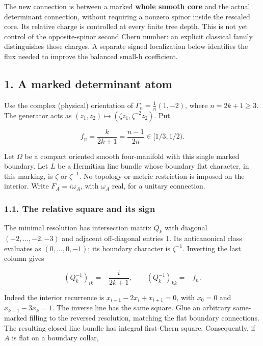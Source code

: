 \documentclass[
  10pt,
]{article}
\begin{document}
The new connection is between a marked \textbf{whole smooth core} and
the actual determinant connection, without requiring a nonzero spinor
inside the rescaled core. Its relative charge is controlled at every
finite tree depth. This is not yet control of the opposite-spinor second
Chern number: an explicit classical family distinguishes those charges.
A separate signed localization below identifies the flux needed to
improve the balanced small-h coefficient.

\hypertarget{a-marked-determinant-atom}{%
\subsection{1. A marked determinant
atom}\label{a-marked-determinant-atom}}

Use the complex (physical) orientation of \(\Gamma_n=\frac1n(1,-2)\),
where \(n=2k+1\ge3\). The generator acts as
\((z_1,z_2)\mapsto(\zeta z_1,\zeta^{-2}z_2)\). Put

\[
 f_n=\frac{k}{2k+1}=\frac{n-1}{2n}\in[1/3,1/2).
 \tag{1.1}
\]

Let \(\Omega\) be a compact oriented smooth four-manifold with this
single marked boundary. Let \(L\) be a Hermitian line bundle whose
boundary flat character, in this marking, is \(\zeta\) or
\(\zeta^{-1}\). No topology or metric restriction is imposed on the
interior. Write \(F_A=i\omega_A\), with \(\omega_A\) real, for a unitary
connection.

\hypertarget{the-relative-square-and-its-sign}{%
\subsubsection{1.1. The relative square and its
sign}\label{the-relative-square-and-its-sign}}

The minimal resolution has intersection matrix \(Q_k\) with diagonal
\((-2,\ldots,-2,-3)\) and adjacent off-diagonal entries 1. Its
anticanonical class evaluates as \((0,\ldots,0,-1)\); its boundary
character is \(\zeta^{-1}\). Inverting the last column gives

\[
 (Q_k^{-1})_{ik}=-\frac{i}{2k+1},\qquad
 (Q_k^{-1})_{kk}=-f_n.
 \tag{1.2}
\]

Indeed the interior recurrence is \(x_{i-1}-2x_i+x_{i+1}=0\), with
\(x_0=0\) and \(x_{k-1}-3x_k=1\). The inverse line has the same square.
Glue an arbitrary same-marked filling to the reversed resolution,
matching the flat boundary connections. The resulting closed line bundle
has integral first-Chern square. Consequently, if \(A\) is flat on a
boundary collar,
\end{document}
